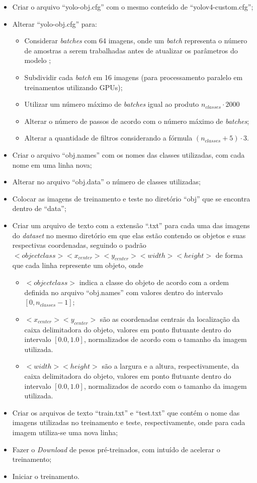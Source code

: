 \begin{itemize}
  \item Criar o arquivo ``yolo-obj.cfg'' com o mesmo conteúdo de ``yolov4-custom.cfg'';
  \item Alterar ``yolo-obj.cfg'' para:
  \begin{itemize}
    \item Considerar \textit{batches} com 64 imagens, onde um \textit{batch} representa o número de amostras a serem trabalhadas antes de atualizar os parâmetros do modelo \cite{ref:Brownlee};
    \item Subdividir cada \textit{batch} em 16 imagens (para processamento paralelo em treinamentos utilizando GPUs);
    \item Utilizar um número máximo de \textit{batches} igual ao produto $n_{classes} \cdot 2000$
    \item Alterar o número de passos de acordo com o número máximo de \textit{batches};
    \item Alterar a quantidade de filtros considerando a fórmula $(n_{classes} + 5) \cdot 3$.
  \end{itemize}
  \item Criar o arquivo ``obj.names'' com os nomes das classes utilizadas, com cada nome em uma linha nova;
  \item Alterar no arquivo ``obj.data'' o número de classes utilizadas;
  \item Colocar as imagens de treinamento e teste no diretório ``obj'' que se encontra dentro de ``data'';
  \item Criar um arquivo de texto com a extensão ``.txt'' para cada uma das imagens do \textit{dataset} no mesmo diretório em que elas estão contendo os objetos e suas respectivas coordenadas, seguindo o padrão  $<objectclass> <x_{center}> <y_{center}> <width> <height>$ de forma que cada linha represente um objeto, onde
  \begin{itemize}
    \item $<objectclass>$ indica a classe do objeto de acordo com a ordem definida no arquivo ``obj.names'' com valores dentro do intervalo $[0, n_{classes} - 1]$;
    \item $<x_{center}> <y_{center}>$ são as coordenadas centrais da localização da caixa delimitadora do objeto, valores em ponto flutuante dentro do intervalo $[0.0, 1.0]$, normalizados de acordo com o tamanho da imagem utilizada.
    \item $<width> <height>$ são a largura e a altura, respectivamente, da caixa delimitadora do objeto, valores em ponto flutuante dentro do intervalo $[0.0, 1.0]$, normalizados de acordo com o tamanho da imagem utilizada.
  \end{itemize}
  \item Criar os arquivos de texto ``train.txt'' e ``test.txt'' que contém o nome das imagens utilizadas no treinamento e teste, respectivamente, onde para cada imagem utiliza-se uma nova linha;
  \item Fazer o \textit{Download} de pesos pré-treinados, com intuído de acelerar o treinamento;
  \item Iniciar o treinamento.
\end{itemize}

